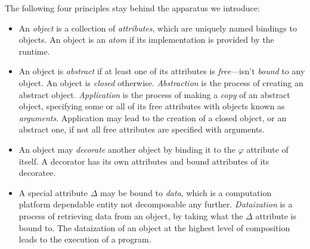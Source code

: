 The following four principles stay behind the
apparatus we introduce:

\begin{itemize}
\item An \emph{object} is a collection of \emph{attributes},
which are uniquely named bindings to objects. An object
is an \emph{atom} if its implementation is provided by the runtime.

\item An object is \emph{abstract} if at least one of its attributes
is \emph{free}---isn't \emph{bound} to any object. An object
is \emph{closed} otherwise.
\emph{Abstraction} is the process of creating an abstract object.
\emph{Application} is the process of making a \emph{copy} of an abstract
object, specifying some or all of its free attributes with
objects known as \emph{arguments}. Application may lead to the
creation of a closed object, or an abstract one, if not all free
attributes are specified with arguments.

\item An object may \emph{decorate} another object by binding it
to the \(\varphi\) attribute of itself. A decorator has its
own attributes and bound attributes of its decoratee.

\item A special attribute \(\Delta\) may be bound to \emph{data},
which is a computation platform dependable entity not
decomposable any further.
\emph{Dataization} is a process of retrieving data from an object,
by taking what the \(\Delta\) attribute is bound to.
The dataization of an object at the highest level of composition
leads to the execution of a program.
\end{itemize}


